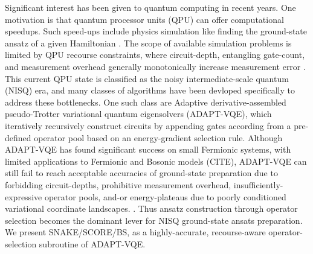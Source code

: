 \documentclass[
  reprint,
  amsmath,
  amssymb,
  aps,
  pra,
  nofootinbib,
  superscriptaddress,
  floatfix
]{revtex4-2}
\begin{document}
Significant interest has been given to quantum computing in recent years. One motivation is that quantum processor units (QPU) can offer computational speedups. Such speed-ups include physics simulation like finding the ground-state ansatz of a given Hamiltonian \cite{Lloyd1996,AspuruGuzik2005}. The scope of available simulation problems is limited by QPU recourse constraints, where circuit-depth, entangling gate-count, and measurement overhead generally monotonically increase measurement error \cite{Preskill2018NISQ,Cerezo2021VQA,Huggins2021Measurements}. This current QPU state is classified as the noisy intermediate-scale quantum (NISQ) era, and many classes of algorithms have been devloped specifically to address these bottlenecks. One such class are Adaptive derivative-assembled pseudo-Trotter variational quantum eigensolvers (ADAPT-VQE),  which iteratively recursively construct circuits by appending gates according from a pre-defined operator pool based on an energy-gradient selection rule. Although ADAPT-VQE has found significant success on small Fermionic systems, with limited applications to Fermionic and Bosonic models (CITE), ADAPT-VQE can still fail to reach acceptable accuracies of ground-state preparation due to forbidding circuit-depths, prohibitive measurement overhead, insufficiently-expressive operator pools, and-or energy-plateaus due to poorly conditioned variational coordinate landscapes. \cite{Grimsley2019,Tang2021,Yordanov2021,Feniou2023,Ramoa2025HessianRecycling,Ikhtiarudin2025ShotEfficient}.  Thus ansatz construction through operator selection becomes the dominant lever for NISQ ground-state ansats preparation. We present SNAKE/SCORE/BS, as a highly-accurate, recourse-aware operator-selection subroutine of ADAPT-VQE.
\end{document}
